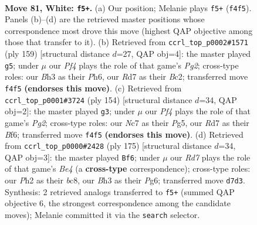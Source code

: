 \documentclass[11pt]{article}
\begin{document}
\clearpage

\begin{figure}[p]\centering
\begin{subfigure}{0.46\textwidth}\centering
\resizebox{\linewidth}{!}{%
\newchessgame
\chessboard[
  setfen={8/PbNR4/6k1/8/np3P2/4K1PB/7P/8 w - - 30 81},
  showmover=false,
  pgfstyle=straightmove, color=movearrow, markmove={f4-f5}
]}
\caption{}
\end{subfigure}\hfill
\begin{subfigure}{0.46\textwidth}\centering
\resizebox{\linewidth}{!}{%
\newchessgame
\chessboard[
  setfen={8/5kp1/7p/1N6/1B5P/1n2K1P1/2b5/8 b - - 7 80},
  showmover=false,
  pgfstyle=straightmove, color=movearrow, markmove={g7-g5}
]}
\caption{}
\end{subfigure}
\\[4pt]
\begin{subfigure}{0.46\textwidth}\centering
\resizebox{\linewidth}{!}{%
\newchessgame
\chessboard[
  setfen={6k1/3b4/5BpP/6P1/8/8/5KP1/8 w - - 13 78},
  showmover=false,
  pgfstyle=straightmove, color=movearrow, markmove={g2-g3}
]}
\caption{}
\end{subfigure}\hfill
\begin{subfigure}{0.46\textwidth}\centering
\resizebox{\linewidth}{!}{%
\newchessgame
\chessboard[
  setfen={2B5/8/3p2p1/2p1b1k1/2P5/1P1K2n1/5R2/8 b - - 48 88},
  showmover=false,
  pgfstyle=straightmove, color=movearrow, markmove={e5-f6}
]}
\caption{}
\end{subfigure}
\caption{\textbf{Move 81, White: \texttt{f5+}.} (a) Our position; Melanie plays \texttt{f5+} (\texttt{f4f5}). Panels (b)--(d) are the retrieved master positions whose correspondence most drove this move (highest QAP objective among those that transfer to it). (b) Retrieved from \texttt{ccrl\_top\_p0002\#1571} (ply 159) [structural distance $d$=27, QAP obj=4]: the master played \texttt{g5}; under $\mu$ our \emph{Pf4} plays the role of that game's \emph{Pg2}; cross-type roles: our \emph{B}h3 as their \emph{P}h6, our \emph{R}d7 as their \emph{B}c2; transferred move \texttt{f4f5} \textbf{(endorses this move)}. (c) Retrieved from \texttt{ccrl\_top\_p0001\#3724} (ply 154) [structural distance $d$=34, QAP obj=2]: the master played \texttt{g3}; under $\mu$ our \emph{Pf4} plays the role of that game's \emph{Pg2}; cross-type roles: our \emph{N}c7 as their \emph{P}g5, our \emph{R}d7 as their \emph{B}f6; transferred move \texttt{f4f5} \textbf{(endorses this move)}. (d) Retrieved from \texttt{ccrl\_top\_p0000\#2428} (ply 175) [structural distance $d$=34, QAP obj=3]: the master played \texttt{Bf6}; under $\mu$ our \emph{Rd7} plays the role of that game's \emph{Be4} (a \textbf{cross-type} correspondence); cross-type roles: our \emph{P}h2 as their \emph{b}c8, our \emph{B}h3 as their \emph{P}g6; transferred move \texttt{d7d3}. Synthesis: 2 retrieved analogs transferred to \texttt{f5+} (summed QAP objective 6, the strongest correspondence among the candidate moves); Melanie committed it via the \texttt{search} selector.}
\label{fig:thought-m160}
\end{figure}
\end{document}

